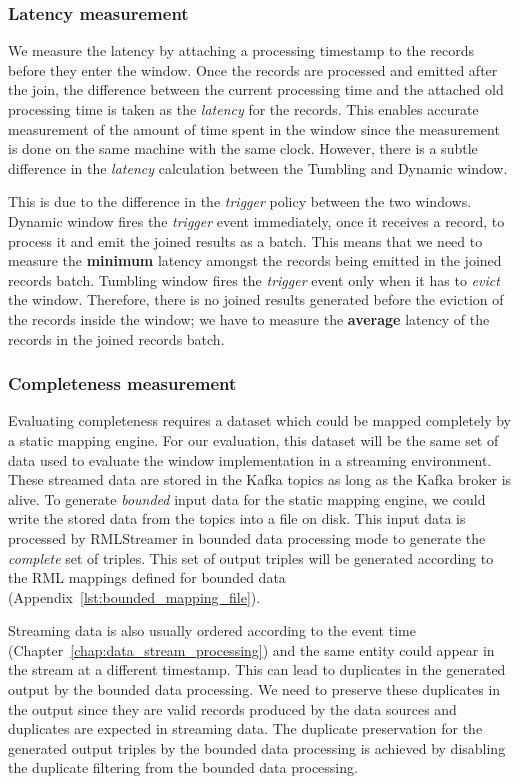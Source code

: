 \subsubsection{Latency measurement}%
\label{ssub:Latency measurement}
We measure the latency by attaching a processing timestamp to the records before they enter the window. 
Once the records are processed and emitted after the join, the difference 
between the current processing time and the attached old processing time 
is taken as the \emph{latency} for the records. This enables accurate measurement of
the amount of time spent in the window since the measurement is done on the 
same machine with the same clock. However, there is a subtle difference
in the \emph{latency} calculation between the Tumbling and Dynamic window.


This is due to the difference in the \emph{trigger} policy between the two windows. 
Dynamic window fires the \emph{trigger} event immediately, once it receives a record, 
to process it and emit the joined results as a batch. This means that we need to measure the 
\textbf{minimum} latency amongst the records being emitted in the joined records batch. 
Tumbling window fires the \emph{trigger} event only when it has to \emph{evict} the window. 
Therefore, there is no joined results generated before the eviction of the records 
inside the window; we have to measure the \textbf{average} latency of the records in the joined 
records batch. 

\subsubsection{Completeness measurement}%
\label{ssub:Completeness measurement}
Evaluating completeness requires a dataset which could be mapped completely by a static 
mapping engine. For our evaluation, this dataset will be the same set of data used to 
evaluate the window implementation in a streaming environment. These streamed data are 
stored in the Kafka topics as long as the Kafka broker is alive. 
To generate \emph{bounded} input data for 
the static mapping engine, we could write the stored data from the topics 
into a file on disk. This input data is processed by RMLStreamer in bounded data 
processing mode to generate the \emph{complete} set of triples. 
This set of output triples will be generated according 
to the RML mappings defined for bounded data (Appendix~\ref{lst:bounded_mapping_file}). 

Streaming data is also usually 
ordered according to the event time (Chapter~\ref{chap:data_stream_processing}) 
and the same entity could appear in the 
stream at a different timestamp. This can lead to duplicates in the generated output by 
the bounded data processing. We need to preserve these duplicates in the 
output since they are valid records produced by the data sources and duplicates are 
expected in streaming data. The duplicate preservation for the generated 
output triples by the bounded data processing
is achieved by disabling 
the duplicate filtering from the bounded data processing. 


